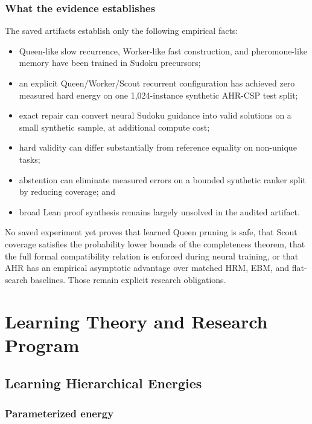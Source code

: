\documentclass[11pt,oneside]{book}
\theoremstyle{remark}
\begin{document}
\section{What the evidence establishes}

The saved artifacts establish only the following empirical facts:
\begin{itemize}
  \item Queen-like slow recurrence, Worker-like fast construction, and
  pheromone-like memory have been trained in Sudoku precursors;
  \item an explicit Queen/Worker/Scout recurrent configuration has achieved
  zero measured hard energy on one 1,024-instance synthetic AHR-CSP test split;
  \item exact repair can convert neural Sudoku guidance into valid solutions
  on a small synthetic sample, at additional compute cost;
  \item hard validity can differ substantially from reference equality on
  non-unique tasks;
  \item abstention can eliminate measured errors on a bounded synthetic
  ranker split by reducing coverage; and
  \item broad Lean proof synthesis remains largely unsolved in the audited
  artifact.
\end{itemize}

No saved experiment yet proves that learned Queen pruning is safe, that Scout
coverage satisfies the probability lower bounds of the completeness theorem,
that the full formal compatibility relation is enforced during neural
training, or that AHR has an empirical asymptotic advantage over matched HRM,
EBM, and flat-search baselines. Those remain explicit research obligations.

\part{Learning Theory and Research Program}

\chapter{Learning Hierarchical Energies}

\section{Parameterized energy}
\end{document}

